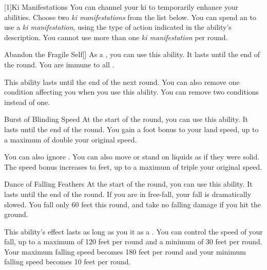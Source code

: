         [1]{Ki Manifestations}
        You can channel your ki to temporarily enhance your abilities.
        Choose two \textit{ki manifestations} from the list below.
        You can spend an  to use a \textit{ki manifestation}, using the type of action indicated in the ability's description.
        You cannot use more than one \textit{ki manifestation} per round.
        {
            \begin{ability}{Abandon the Fragile Self}[]
                As a , you can use this ability.
                It lasts until the end of the round.
                You are immune to all .

                \rankline
                 This ability lasts until the end of the next round.
                 You can also remove one condition affecting you when you use this ability.
                 You can remove two conditions instead of one.
            \end{ability}

            \begin{ability}{Burst of Blinding Speed}
                At the start of the round, you can use this ability.
                It lasts until the end of the round.
                You gain a  foot bonus to your land speed, up to a maximum of double your original speed.

                \rankline
                 You can also ignore .
                 You can also move or stand on liquids as if they were solid.
                 The speed bonus increases to  feet, up to a maximum of triple your original speed.
            \end{ability}

            \begin{ability}{Dance of Falling Feathers}
                At the start of the round, you can use this ability.
                It lasts until the end of the round.
                If you are in free-fall, your fall is dramatically slowed.
                You fall only 60 feet this round, and take no falling damage if you hit the ground.

                \rankline
                 This ability's effect lasts as long as you  it as a .
                 You can control the speed of your fall, up to a maximum of 120 feet per round and a minimum of 30 feet per round.
                 Your maximum falling speed becomes 180 feet per round and your minimum falling speed becomes 10 feet per round.
            \end{ability}

}
